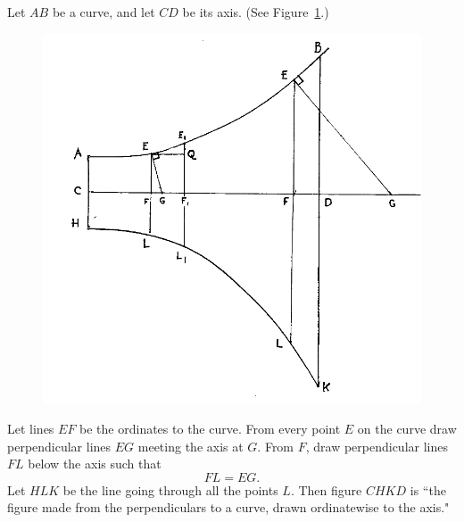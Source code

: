\documentclass[twoside,openright]{article}
\begin{document}
Let $AB$ be a curve, and let $CD$ be its axis. (See Figure~\ref{acurve}.)
\begin{figure}[ht]
\begin{center}
\includegraphics[width=\textwidth]{fig/Figure44}
\caption{}
\label{acurve}
\vspace{-10pt}
\end{center}
\end{figure} 
Let lines $EF$ be the ordinates to the curve.  From every point $E$ on
the curve draw perpendicular lines $EG$ meeting the axis at $G$.  From
$F$, draw perpendicular lines $FL$ below the axis such that
$$FL = EG.$$
Let $HLK$ be the line going through all the points $L$.  Then figure
$CHKD$ is ``the figure made from the perpendiculars to a curve, drawn
ordinatewise to the axis."
\end{document}
